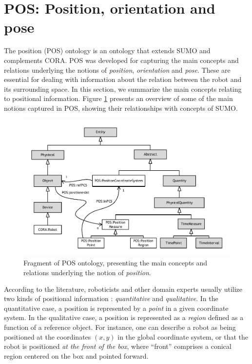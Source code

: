 \documentclass[preprint,12pt]{elsarticle}
\newcommand{\hlc}[2][yellow]{ {\sethlcolor{#1} \hl{#2}} }
\newcommand{\paulo}[1]{{\hlc[cyan]{\textbf{Paulo}: #1}}}
\newcommand{\joel}[1]{{\hlc[green]{\textbf{Joel}: #1}}}
\newcommand{\qm}[1]{``#1''}
\begin{document}



\section{POS: Position, orientation and pose}

The position (POS) ontology is an ontology that extends SUMO and complements CORA. POS was developed for capturing the main concepts and relations underlying the notions of \emph{position}, \emph{orientation} and \emph{pose}. These  are essential for dealing with information about the relation between the robot and its surrounding space. In this section, we summarize the main concepts relating to positional information. Figure \ref{fig:POS} presents an overview of some of the main notions captured in POS, showing their relationships with concepts of SUMO.

\begin{figure}[h]
    \centering
    \includegraphics[width=1.0\textwidth]{figs/pos}
    \caption{Fragment of POS ontology, presenting the main concepts and relations underlying the notion of \emph{position}.}
    \label{fig:POS}
\end{figure}

According to the literature, roboticists and other domain experts usually utilize two kinds of positional information \cite{ye2007unified}: \emph{quantitative} and \emph{qualitative}. In the quantitative case, a position is represented by a \emph{point} in a given coordinate system. In the qualitative case, a position is represented as a \emph{region} defined as a function of a reference object. For instance, one can describe a robot as being positioned at the coordinates $(x, y)$ in the global coordinate system, or that the robot is positioned \emph{at the front of the box}, where \qm{front} comprises a conical region centered on the box and pointed forward.
\end{document}
